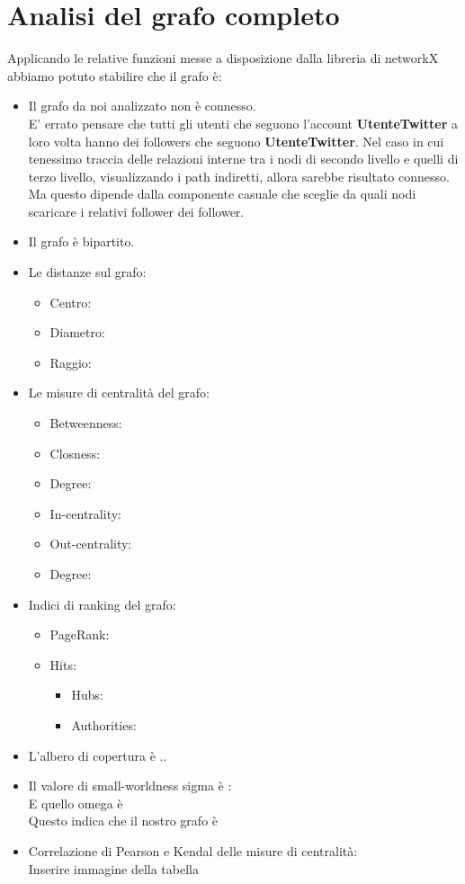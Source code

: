 \documentclass[a4paper,11pt]{report}
\begin{document}
\pagebreak
\chapter{Analisi del grafo completo}
Applicando le relative funzioni messe a disposizione dalla libreria di networkX abbiamo potuto stabilire che il grafo è:
\begin{itemize}
	\item Il grafo da noi analizzato non è connesso.\\
	E' errato pensare che tutti gli utenti che seguono l'account \textbf{UtenteTwitter} a loro volta hanno dei followers che seguono \textbf{UtenteTwitter}. Nel caso in cui tenessimo traccia delle relazioni interne tra i nodi di secondo livello e quelli di terzo livello, visualizzando i path indiretti, allora sarebbe risultato connesso. Ma questo dipende dalla componente casuale che sceglie da quali nodi scaricare i relativi follower dei follower. 
	\item Il grafo è bipartito.
	\item Le distanze sul grafo:
		\begin{itemize}
			\item Centro: 
			\item Diametro: 
			\item Raggio: 
		\end{itemize}
	
	\item Le misure di centralità del grafo:
		\begin{itemize}
			\item Betweenness: 
			\item Closness: 
			\item Degree: 
			\item In-centrality: 
			\item Out-centrality: 
			\item Degree: 
		\end{itemize}
	
	\item Indici di ranking del grafo:
		\begin{itemize}
			\item PageRank:
			\item Hits: 
				\begin{itemize}
					\item Hubs:
					\item Authorities: 
			\end{itemize}
		\end{itemize}
	\item L'albero di copertura è ..
	\item Il valore di small-worldness sigma è : \\
	E quello omega è \\
	Questo indica che il nostro grafo è
	\item Correlazione di Pearson e Kendal delle misure di centralità:\\ 
	Inserire immagine della tabella 
\end{itemize}
\pagebreak
\end{document}
